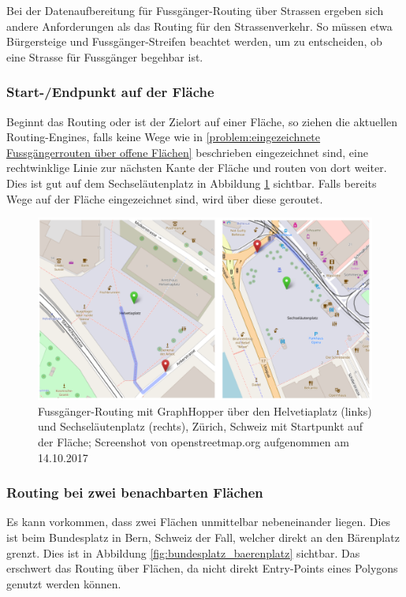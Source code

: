 Bei der Datenaufbereitung für Fussgänger-Routing über Strassen ergeben sich andere Anforderungen als das Routing für den Strassenverkehr. So müssen etwa Bürgersteige und Fussgänger-Streifen beachtet werden, um zu entscheiden, ob eine Strasse für Fussgänger begehbar ist.

\subsubsection{Start-/Endpunkt auf der Fläche}
\label{problem:Start-/Endpunkt auf der Fläche}
Beginnt das Routing oder ist der Zielort auf einer Fläche, so ziehen die aktuellen Routing-Engines, falls keine Wege wie in \ref{problem:eingezeichnete Fussgängerrouten über offene Flächen} beschrieben eingezeichnet sind, eine rechtwinklige Linie zur nächsten Kante der Fläche und routen von dort weiter. Dies ist gut auf dem Sechseläutenplatz in Abbildung \ref{fig:start_endpoint_on_area} sichtbar. Falls bereits Wege auf der Fläche eingezeichnet sind, wird über diese geroutet.

\begin{figure}[ht]
    \centering
    \includegraphics[width=1\linewidth]{technicalreport/img/start_endpoint_on_area}
    \caption[Fussgänger-Routing mit Startpunkt auf der Fläche]{Fussgänger-Routing mit GraphHopper über den Helvetiaplatz (links) und Sechseläutenplatz (rechts), Zürich, Schweiz mit Startpunkt auf der Fläche; Screenshot von openstreetmap.org aufgenommen am 14.10.2017}
    \label{fig:start_endpoint_on_area}
\end{figure}

\subsubsection{Routing bei zwei benachbarten Flächen}
\label{problem:Routing bei zwei benachbarten Flächen}
Es kann vorkommen, dass zwei Flächen unmittelbar nebeneinander liegen. Dies ist beim Bundesplatz in Bern, Schweiz der Fall, welcher direkt an den Bärenplatz grenzt. Dies ist in Abbildung \ref{fig:bundesplatz_baerenplatz} sichtbar. Das erschwert das Routing über Flächen, da nicht direkt Entry-Points eines Polygons genutzt werden können.

